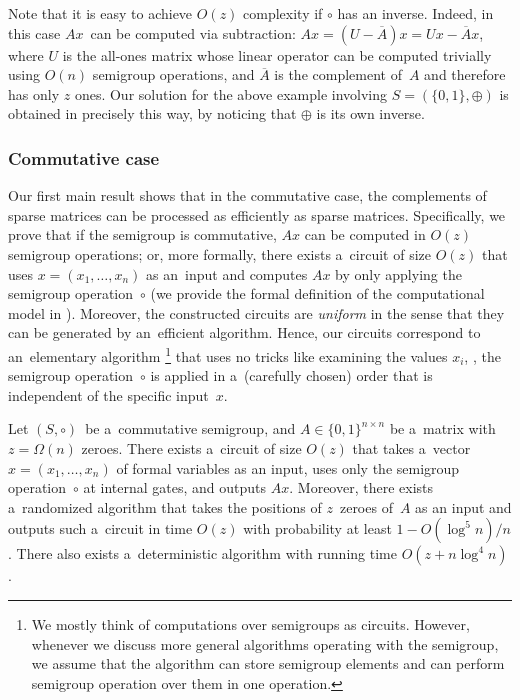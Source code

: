 \noindent
Note that it is easy to achieve $O(z)$ complexity if $\circ$ has an inverse.
Indeed, in this case $Ax$~can be computed via subtraction:
$Ax = (U-\overline{A})x = Ux - \overline{A}x$, where $U$ is the all-ones matrix
whose linear operator can be computed trivially using $O(n)$ semigroup
operations, and $\overline{A}$ is the complement of~$A$ and therefore has only
$z$ ones. Our solution for the above example involving $S=(\{0,1\}, \oplus)$
is obtained in precisely this way, by noticing that $\oplus$ is its own inverse.

\subsubsection{Commutative case}
Our first main result shows that in the commutative case,
the %
complements
of sparse matrices can be processed as
efficiently as sparse matrices. Specifically, we prove
that if the semigroup is commutative, $Ax$ can be computed in $O(z)$ semigroup
operations; or, more formally, there exists
a~circuit of size $O(z)$ that uses $x=(x_1, \dotsc, x_n)$ as
an~input and computes $Ax$ by only applying the semigroup
operation~$\circ$ (we provide the formal definition of the
computational model in ). Moreover,
the constructed circuits are \emph{uniform} in the sense that they
can be generated by an~efficient algorithm. Hence, our circuits
correspond to an~elementary algorithm%
\footnote{We mostly think of computations over semigroups as circuits. However, whenever we discuss more general algorithms operating with the semigroup, we assume that the algorithm can store semigroup elements and can perform semigroup operation over them in one operation.}
%
 that uses no tricks like examining the
values $x_i$, \ie, the semigroup operation~$\circ$ is applied in a~(carefully
chosen) order that is independent of the specific input~$x$.

\begin{theorem}
\label{thm:upperboundold}
Let $(S, \circ)$~be a~commutative semigroup,
and $A \in \{0,1\}^{n \times n}$ be a~matrix
with~$z=\Omega(n)$ zeroes.
There exists a~circuit of size $O(z)$ that takes
a~vector $x = (x_1,\ldots, x_n)$ of formal variables as an input,
uses only the semigroup operation~$\circ$ at internal gates,
and outputs $Ax$. Moreover, there exists a~randomized
algorithm that takes the positions of $z$~zeroes of~$A$
as an input and outputs such a~circuit in time $O(z)$
with probability at least $1-O(\log^5n)/n$. There also
exists a~deterministic algorithm with running time $O(z+n\log^4n)$.
\end{theorem}

